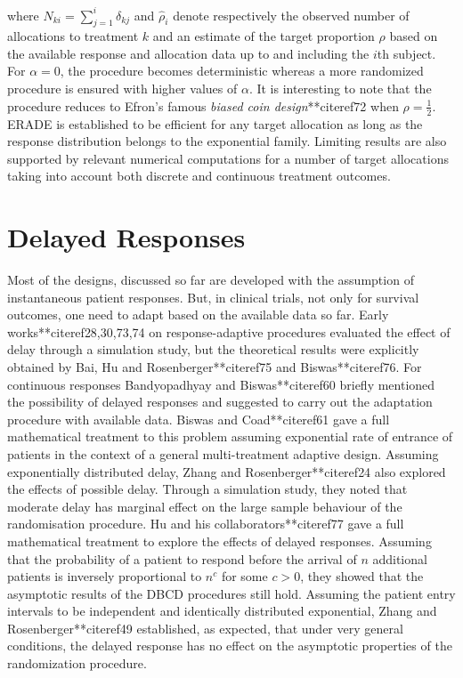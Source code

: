 where   $N_{ki}=\sum_{j=1}^{i}\delta_{kj}$ and $\hat{\rho}_{i}$  denote respectively the observed number of allocations to treatment $k$ and an  estimate of the target proportion $\rho$ based on the available response and allocation data up to and including the $i$th subject.  For $\alpha=0$, the procedure becomes deterministic whereas a more randomized procedure is ensured with higher values of $\alpha.$  It is interesting to note that the procedure reduces to Efron's famous \textit{biased coin design}**citeref{72}  when $\rho=\frac{1}{2}.$ ERADE is established to be efficient for any target allocation as long as the response distribution belongs to the exponential family. Limiting results are also supported by relevant numerical computations for a number of target allocations taking into account both discrete and continuous treatment outcomes.

\section{Delayed Responses}

Most of the designs, discussed so far are developed with the
assumption of instantaneous patient responses. But, in clinical
trials, not only for survival outcomes, one need to adapt based on the available data so far. Early works**citeref{28,30,73,74}  on response-adaptive
procedures evaluated the effect of delay through a simulation study, but the theoretical results were explicitly obtained by Bai, Hu and
Rosenberger**citeref{75} and Biswas**citeref{76}. For continuous responses
Bandyopadhyay and Biswas**citeref{60} briefly mentioned the possibility
of delayed responses and suggested to carry out the adaptation
procedure with available data. Biswas and Coad**citeref{61} gave a full
mathematical treatment to this problem assuming exponential rate of
entrance of patients in the context of a general multi-treatment
adaptive design. Assuming exponentially distributed delay, Zhang
and Rosenberger**citeref{24} also explored the effects of possible delay.
Through a simulation study, they noted that moderate delay
has marginal effect on the large sample behaviour of the
randomisation procedure. Hu and his collaborators**citeref{77} gave a
full mathematical treatment to explore the effects of delayed
responses. Assuming that the probability of a patient to respond
before the arrival of $n$ additional patients is inversely
proportional to $n^{c}$ for some $c>0$, they showed that the
asymptotic results of the DBCD procedures still hold. Assuming the
patient entry intervals to be independent and identically distributed exponential, Zhang and Rosenberger**citeref{49} established, as expected, that under very general conditions, the delayed response has no effect on the asymptotic properties of the randomization procedure.

